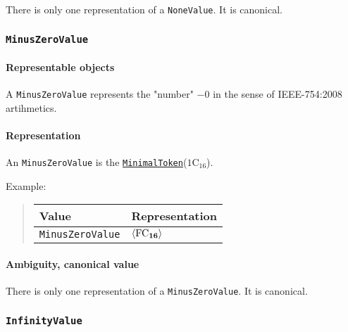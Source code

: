 \documentclass{dbor-article}
\newcommand{\HexNumber}[1]{\mathrm{#1}_{16}}
\newcommand{\DborSyntaxIdent}[1]{\texttt{#1}}
\newcommand{\DborSyntaxIdentRef}[1]{\hyperlink{sec:def:#1}{\DborSyntaxIdent{#1}}}
\newcommand{\DborFirstByte}[2]{\mathbf{\textcolor{#1}{\HexNumber{#2}}}}
\newcommand{\DborFirstByteNumber}[1]{\DborFirstByte{black}{#1}}
\begin{document}
    There is only one representation of a \DborSyntaxIdent{NoneValue}.
    It is canonical.


    \subsubsection{\DborSyntaxIdent{MinusZeroValue}}
    \label{sec:def:MinusZeroValue}
    \hypertarget{sec:def:MinusZeroValue}{}

    \paragraph{Representable objects}

    A \DborSyntaxIdent{MinusZeroValue} represents the "number" $-0$ in the sense of IEEE-754:2008 artihmetics.

    \paragraph{Representation}

    An \DborSyntaxIdent{MinusZeroValue} is the \DborSyntaxIdentRef{MinimalToken}($\HexNumber{1C}$).

    \smallskip
    \noindent
    Example:
    \nolinebreak
    \begin{quote}    
        \begin{tabular}{ll}
            \toprule
            Value & Representation \\
            \midrule
            \DborSyntaxIdent{MinusZeroValue} 
                & $\langle \DborFirstByteNumber{FC} \rangle$ \\
            \bottomrule
        \end{tabular}
    \end{quote}

    \paragraph{Ambiguity, canonical value}

    There is only one representation of a \DborSyntaxIdent{MinusZeroValue}.
    It is canonical.


    \subsubsection{\DborSyntaxIdent{InfinityValue}}
    \label{sec:def:InfinityValue}
    \hypertarget{sec:def:InfinityValue}{}
\end{document}
